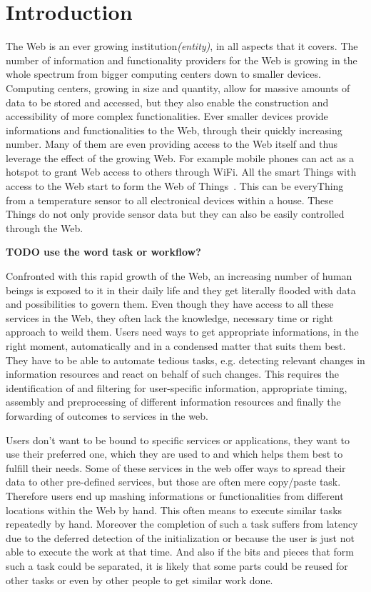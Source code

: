
\chapter{Introduction}

The Web is an ever growing institution\textit{(entity)}, in all aspects that it covers.
The number of information and functionality providers for the Web is growing in the whole spectrum from bigger computing centers down to smaller devices.
Computing centers, growing in size and quantity, allow for massive amounts of data to be stored and accessed, but they also enable the construction and accessibility of more complex functionalities.
Ever smaller devices provide informations and functionalities to the Web, through their quickly increasing number.
Many of them are even providing access to the Web itself and thus leverage the effect of the growing Web.
For example mobile phones can act as a hotspot to grant Web access to others through \textrm{WiFi}.
All the smart \textrm{Things} with access to the Web start to form the \textrm{Web of Things}~\cite{Guinard2011WoT}.
This can be every\textrm{Thing} from a temperature sensor to all electronical devices within a house.
These \textrm{Things} do not only provide sensor data but they can also be easily controlled through the Web.

\textbf{TODO use the word task or workflow?}

Confronted with this rapid growth of the Web, an increasing number of human beings is exposed to it in their daily life and they get literally flooded with data and possibilities to govern them.
Even though they have access to all these services in the Web, they often lack the knowledge, necessary time or right approach to weild them.
Users need ways to get appropriate informations, in the right moment, automatically and in a condensed matter that suits them best.
They have to be able to automate tedious tasks, e.g. detecting relevant changes in information resources and react on behalf of such changes.
This requires the identification of and filtering for user-specific information, appropriate timing, assembly and preprocessing of different information resources and finally the forwarding of outcomes to services in the web. 

Users don't want to be bound to specific services or applications, they want to use their preferred one, which they are used to and which helps them best to fulfill their needs.
Some of these services in the web offer ways to spread their data to other pre-defined services, but those are often mere copy/paste task.
Therefore users end up mashing informations or functionalities from different locations within the Web by hand.
This often means to execute similar tasks repeatedly by hand.
Moreover the completion of such a task suffers from latency due to the deferred detection of the initialization or because the user is just not able to execute the work at that time.
And also if the bits and pieces that form such a task could be separated, it is likely that some parts could be reused for other tasks or even by other people to get similar work done.

